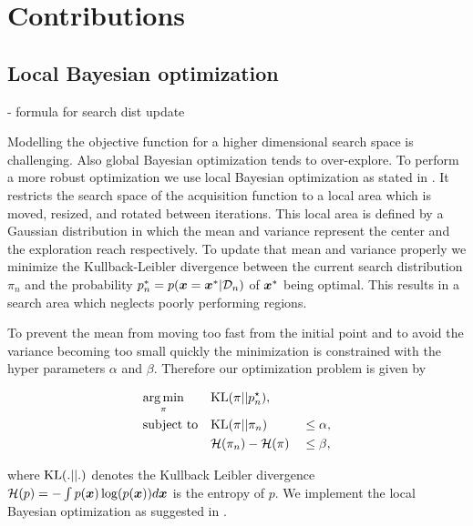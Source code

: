 \chapter{Contributions}
\label{chap:contributions}


\section{Local Bayesian optimization}
\label{sec:localBO}
- formula for search dist update

Modelling the objective function for a higher dimensional search space is challenging. Also global Bayesian optimization tends to over-explore. To perform a more robust optimization we use local Bayesian optimization as stated in \cite{akrour2017local}. It restricts the search space of the acquisition function to a local area which is moved, resized, and rotated between iterations. This local area is defined by a Gaussian distribution in which the mean and variance represent the center and the exploration reach respectively. To update that mean and variance properly we minimize the Kullback-Leibler divergence between the current search distribution $\pi_n$ and the probability $p_n^* = p({\boldsymbol{x}}={\boldsymbol{x}}^*|\mathcal{D}_n)$ of ${\boldsymbol{x}}^*$ being optimal. This results in a search area which neglects poorly performing regions.

To prevent the mean from moving too fast from the initial point and to avoid the variance becoming too small quickly the minimization is constrained with the hyper parameters $\alpha$ and $\beta$. Therefore our optimization problem is given by

\begin{align}
    & \underset{\pi}{\arg\min} & & \mathrm{KL}(\pi||p_n^\star),& &\notag\\
    & \text{subject to}
    & & \mathrm{KL}(\pi||\pi_n) & &\leq \alpha,\label{eq:kl:our}\\
    & & &{\cal H}(\pi_n) - {\cal H}(\pi) & &\leq \beta,\label{eq:entropy:our}
\end{align}

where $\mathrm{KL}(.||.)$ denotes the Kullback Leibler divergence $\mathcal{H}(p) = -\int p({\boldsymbol{x}})\log(p({\boldsymbol{x}})) d{\boldsymbol{x}}$ is the entropy of $p$. We implement the local Bayesian optimization as suggested in \cite{akrour2017local}.

